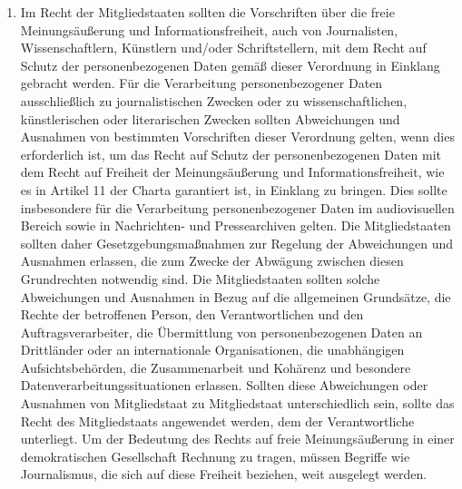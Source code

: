 \begin{enumerate}
   \item Im Recht der Mitgliedstaaten sollten die Vorschriften über die freie Meinungsäußerung und Informationsfreiheit,
    auch von Journalisten, Wissenschaftlern, Künstlern und/oder Schriftstellern, mit dem Recht auf Schutz der
    personenbezogenen Daten gemäß dieser Verordnung in Einklang gebracht werden. Für die Verarbeitung personenbezogener
    Daten ausschließlich zu journalistischen Zwecken oder zu wissenschaftlichen, künstlerischen oder literarischen
    Zwecken sollten Abweichungen und Ausnahmen von bestimmten Vorschriften dieser Verordnung gelten, wenn dies
    erforderlich ist, um das Recht auf Schutz der personenbezogenen Daten mit dem Recht auf Freiheit der
    Meinungsäußerung und Informationsfreiheit, wie es in Artikel 11 der Charta garantiert ist, in Einklang zu bringen.
    Dies sollte insbesondere für die Verarbeitung personenbezogener Daten im audiovisuellen Bereich sowie in
    Nachrichten- und Pressearchiven gelten. Die Mitgliedstaaten sollten daher Gesetzgebungsmaßnahmen zur Regelung der
    Abweichungen und Ausnahmen erlassen, die zum Zwecke der Abwägung zwischen diesen Grundrechten notwendig sind. Die
    Mitgliedstaaten sollten solche Abweichungen und Ausnahmen in Bezug auf die allgemeinen Grundsätze, die Rechte der
    betroffenen Person, den Verantwortlichen und den Auftragsverarbeiter, die Übermittlung von personenbezogenen Daten
    an Drittländer oder an internationale Organisationen, die unabhängigen Aufsichtsbehörden, die Zusammenarbeit und
    Kohärenz und besondere Datenverarbeitungssituationen erlassen. Sollten diese Abweichungen oder Ausnahmen von
    Mitgliedstaat zu Mitgliedstaat unterschiedlich sein, sollte das Recht des Mitgliedstaats angewendet werden, dem der
    Verantwortliche unterliegt. Um der Bedeutung des Rechts auf freie Meinungsäußerung in einer demokratischen
    Gesellschaft Rechnung zu tragen, müssen Begriffe wie Journalismus, die sich auf diese Freiheit beziehen, weit
    ausgelegt werden.%
   \label{eg:153}
   


\end{enumerate}
